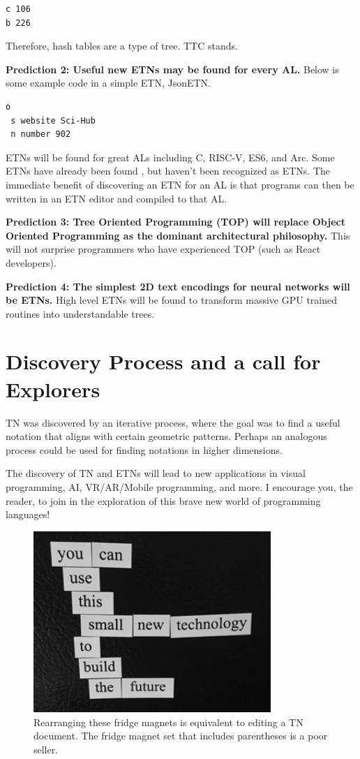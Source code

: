 \documentclass[journal]{IEEEtran}
\begin{document}
\begin{lstlisting}
c 106
b 226
\end{lstlisting}

Therefore, hash tables are a type of tree. TTC stands.

\textbf{Prediction 2: Useful new ETNs may be found for every AL.} Below is some example code in a simple ETN, JsonETN.

\begin{lstlisting}
o
 s website Sci-Hub
 n number 902
\end{lstlisting}

ETNs will be found for great ALs including C, RISC-V, ES6, and Arc. Some ETNs have already been found \cite{Roughan}, but haven't been recognized as ETNs. The immediate benefit of discovering an ETN for an AL is that programs can then be written in an ETN editor and compiled to that AL.

\textbf{Prediction 3: Tree Oriented Programming (TOP) will replace Object Oriented Programming as the dominant architectural philosophy.} This will not surprise programmers who have experienced TOP (such as React developers).

\textbf{Prediction 4: The simplest 2D text encodings for neural networks will be ETNs.} High level ETNs will be found to transform massive GPU trained routines into understandable trees.

\section{Discovery Process and a call for Explorers}

TN was discovered by an iterative process, where the goal was to find a useful notation that aligns with certain geometric patterns. Perhaps an analogous process could be used for finding notations in higher dimensions.

The discovery of TN and ETNs will lead to new applications in visual programming, AI, VR/AR/Mobile programming, and more. I encourage you, the reader, to join in the exploration of this brave new world of programming languages!

\begin{figure}[ht!]
\centering
\includegraphics[width=90mm]{tree.jpg}
\caption{Rearranging these fridge magnets is equivalent to editing a TN document. The fridge magnet set that includes parentheses is a poor seller.}
\end{figure}
\end{document}
